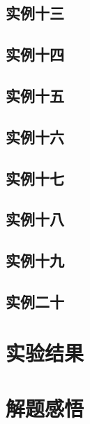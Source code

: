\documentclass[a4paper]{article}
\begin{document}
\subsection{实例十三}
\subsection{实例十四}
\subsection{实例十五}
\subsection{实例十六}
\subsection{实例十七}
\subsection{实例十八}
\subsection{实例十九}
\subsection{实例二十}
\section{实验结果}
\section{解题感悟}
\end{document}
